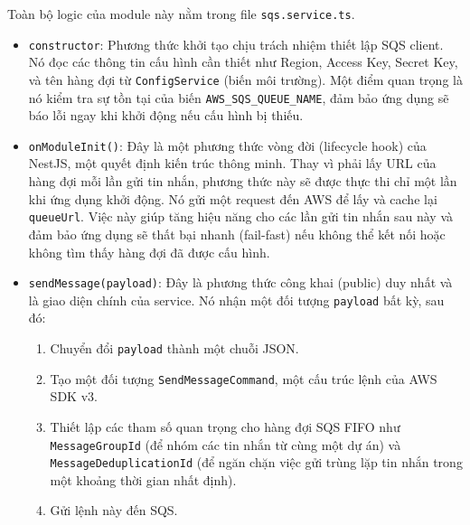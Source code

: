 Toàn bộ logic của module này nằm trong file \texttt{sqs.service.ts}.

\begin{itemize}
    \item \texttt{constructor}: Phương thức khởi tạo chịu trách nhiệm thiết lập SQS client. Nó đọc các thông tin cấu hình cần thiết như Region, Access Key, Secret Key, và tên hàng đợi từ \texttt{ConfigService} (biến môi trường). Một điểm quan trọng là nó kiểm tra sự tồn tại của biến \texttt{AWS\_SQS\_QUEUE\_NAME}, đảm bảo ứng dụng sẽ báo lỗi ngay khi khởi động nếu cấu hình bị thiếu.
    
    \item \texttt{onModuleInit()}: Đây là một phương thức vòng đời (lifecycle hook) của NestJS, một quyết định kiến trúc thông minh. Thay vì phải lấy URL của hàng đợi mỗi lần gửi tin nhắn, phương thức này sẽ được thực thi chỉ một lần khi ứng dụng khởi động. Nó gửi một request đến AWS để lấy và cache lại \texttt{queueUrl}. Việc này giúp tăng hiệu năng cho các lần gửi tin nhắn sau này và đảm bảo ứng dụng sẽ thất bại nhanh (fail-fast) nếu không thể kết nối hoặc không tìm thấy hàng đợi đã được cấu hình.
    
    \item \texttt{sendMessage(payload)}: Đây là phương thức công khai (public) duy nhất và là giao diện chính của service. Nó nhận một đối tượng \texttt{payload} bất kỳ, sau đó:
    \begin{enumerate}
        \item Chuyển đổi \texttt{payload} thành một chuỗi JSON.
        \item Tạo một đối tượng \texttt{SendMessageCommand}, một cấu trúc lệnh của AWS SDK v3.
        \item Thiết lập các tham số quan trọng cho hàng đợi SQS FIFO như \texttt{MessageGroupId} (để nhóm các tin nhắn từ cùng một dự án) và \texttt{MessageDeduplicationId} (để ngăn chặn việc gửi trùng lặp tin nhắn trong một khoảng thời gian nhất định).
        \item Gửi lệnh này đến SQS.
    \end{enumerate}
\end{itemize}